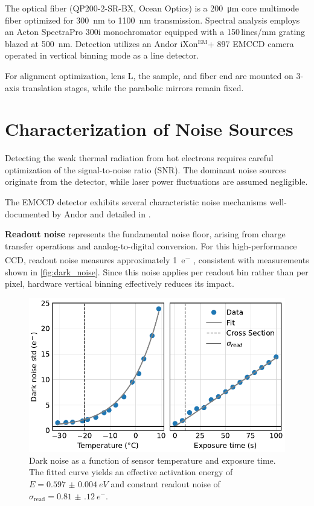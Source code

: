 \documentclass[
	parskip=half,
	a4paper,
]{scrarticle}
\begin{document}
The optical fiber (QP200-2-SR-BX, Ocean Optics) is a \SI{200}{\micro m} core multimode fiber optimized for \SI{300}{nm} to \SI{1100}{nm} transmission. Spectral analysis employs an Acton SpectraPro 300i monochromator equipped with a 150\,lines/mm grating blazed at \SI{500}{nm}. Detection utilizes an Andor iXon$^\text{EM}$+ 897 EMCCD camera operated in vertical binning mode as a line detector.

For alignment optimization, lens L, the sample, and fiber end are mounted on 3-axis translation stages, while the parabolic mirrors remain fixed.

\section{Characterization of Noise Sources}

Detecting the weak thermal radiation from hot electrons requires careful optimization of the signal-to-noise ratio (SNR). The dominant noise sources originate from the detector, while laser power fluctuations are assumed negligible.

The EMCCD detector exhibits several characteristic noise mechanisms well-documented by Andor \cite{andor_establishing_nodate,dr_jo_walters_sensitivity_2023} and detailed in \cite{european_machine_vision_association_standard_2010}.

\textbf{Readout noise} represents the fundamental noise floor, arising from charge transfer operations and analog-to-digital conversion. For this high-performance CCD, readout noise measures approximately \SI{1}{e^-} \cite{andor_ixonem_nodate}, consistent with measurements shown in \autoref{fig:dark_noise}. Since this noise applies per readout bin rather than per pixel, hardware vertical binning effectively reduces its impact.

\begin{figure}
    \centering
    \includegraphics{../analysis/figures/dark_noise.pdf}
    \caption{Dark noise as a function of sensor temperature and exposure time. The fitted curve yields an effective activation energy of $E = \SI{0.597(4)}{eV}$ and constant readout noise of $\sigma_{\text{read}} = \SI{0.81(12)}{e^-}$.}
    \label{fig:dark_noise}
\end{figure}
\end{document}
